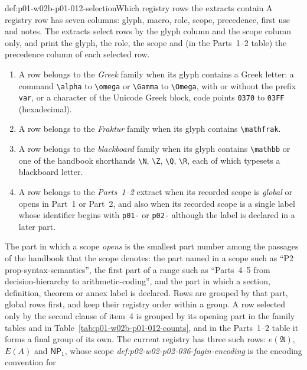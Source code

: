 \begin{hbconvention}{def:p01-w02b-p01-012-selection}{Which registry rows the extracts contain}
A registry row has seven columns: glyph, macro, role, scope, precedence,
first use and notes.  The extracts select rows by the glyph column and the
scope column only, and print the glyph, the role, the scope and (in the
Parts~1--2 table) the precedence column of each selected row.
\begin{enumerate}
\item A row belongs to the \emph{Greek} family when its glyph contains a
  Greek letter: a command \texttt{\textbackslash alpha} to
  \texttt{\textbackslash omega} or \texttt{\textbackslash Gamma} to
  \texttt{\textbackslash Omega}, with or without the prefix
  \texttt{var}, or a character of the Unicode Greek block, code points
  \texttt{0370} to \texttt{03FF} (hexadecimal).
\item A row belongs to the \emph{Fraktur} family when its glyph contains
  \texttt{\textbackslash mathfrak}.
\item A row belongs to the \emph{blackboard} family when its glyph contains
  \texttt{\textbackslash mathbb} or one of the handbook shorthands
  \texttt{\textbackslash N}, \texttt{\textbackslash Z},
  \texttt{\textbackslash Q}, \texttt{\textbackslash R}, each of which
  typesets a blackboard letter.
\item A row belongs to the \emph{Parts~1--2} extract when its recorded scope
  is \emph{global} or opens in Part~1 or Part~2, and also when its
  recorded scope is a single label whose identifier begins with
  \texttt{p01-} or \texttt{p02-} although the label is declared in a later
  part.
\end{enumerate}
The part in which a scope \emph{opens} is the smallest part number among
the passages of the handbook that the scope denotes: the part named in a
scope such as ``P2 prop-syntax-semantics'', the first part of a range
such as ``Parts~4--5 from decision-hierarchy to arithmetic-coding'', and
the part in which a section, definition, theorem or annex label is
declared.  Rows are grouped by that part, global rows first, and keep
their registry order within a group.  A row selected only by the second
clause of item~4 is grouped by its opening part in the family tables and
in Table~\ref{tab:p01-w02b-p01-012-counts}, and in the Parts~1--2 table it
forms a final group of its own.  The current registry has three such rows:
\(e(\mathfrak A)\), \(E(A)\) and \(\mathsf{NP}_1\), whose scope
\emph{def:p02-w02-p02-036-fagin-encoding} is the encoding convention for

\end{hbconvention}
